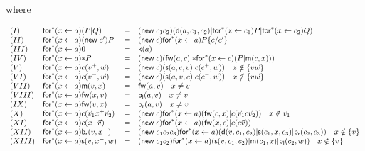 \documentclass[submission,copyright,creativecommons]{eptcs}
\newcommand{\ldb}{[\![}
\newcommand{\rdb}{]\!]}
\newcommand{\pzero}{\mathbin{0}}
\newcommand{\substn}[2]{\{ #1 / #2 \}}
\newcommand{\meaningof}[1]{\ldb #1 \rdb}
\theoremstyle{definition}
\theoremstyle{remark}
\theoremstyle{remark}
\begin{document}

where

\[\begin{array}{llrl}
(I)&\mathsf{for}^*(x \leftarrow a)(P|Q) &=& (\mathsf{new}\; c_1c_2)(\mathsf{d}(a,c_1,c_2) | \mathsf{for}^*(x \leftarrow c_1)P | \mathsf{for}^*(x \leftarrow c_2)Q)\\
(II)&\mathsf{for}^*(x \leftarrow a)(\mathsf{new}\; c')P &=& (\mathsf{new}\; c)\mathsf{for}^*(x \leftarrow a)P\substn{c}{c'} \\
(III)& \mathsf{for}^*(x \leftarrow a)\pzero &=& \mathsf{k}(a) \\
(IV)&\mathsf{for}^*(x \leftarrow a)\mathsf{*}P &=& (\mathsf{new}\;c)(\mathsf{fw}(a,c) | \mathsf{*}\mathsf{for}^*(x \leftarrow c)(P | \mathsf{m}(c,x)))\\
(V)&\mathsf{for}^*(x \leftarrow a)c(v^+,\vec{w}) &=& (\mathsf{new}\;c)(\mathsf{s}(a,c,v) | c(c^+,\vec{w})) \mbox{\quad $x \notin \{v\vec{w}\}$}\\
(VI)&\mathsf{for}^*(x \leftarrow a)c(v^-,\vec{w})&=& (\mathsf{new}\;c)(\mathsf{s}(a,v,c) | c(c^-,\vec{w})) \mbox{\quad $x \notin \{v\vec{w}\}$}\\
(VII)&\mathsf{for}^*(x \leftarrow a)\mathsf{m}(v,x)&=& \mathsf{fw}(a,v) \mbox{\quad $x \neq v$}\\
(VIII)&\mathsf{for}^*(x \leftarrow a)\mathsf{fw}(x,v)&=& \mathsf{b}_{\mathsf{l}}(a,v) \mbox{\quad $x \neq v$}\\
(IX)&\mathsf{for}^*(x \leftarrow a)\mathsf{fw}(v,x)&=& \mathsf{b}_{\mathsf{r}}(a,v) \mbox{\quad $x \neq v$}\\
(X)&\mathsf{for}^*(x \leftarrow a)c(\vec{v}_1x^+\vec{v}_2)&=&(\mathsf{new}\; c)\mathsf{for}^*(x \leftarrow a)(\mathsf{fw}(c,x) | c(\vec{v}_1c\vec{v}_2)) \mbox{\quad $x \notin \vec{v}_1$}\\
(XI)&\mathsf{for}^*(x \leftarrow a)c(x^-\vec{v})&=& (\mathsf{new}\; c)\mathsf{for}^*(x \leftarrow a)(\mathsf{fw}(x,c) | c(c\vec{v}))\\
(XII)&\mathsf{for}^*(x \leftarrow a)\mathsf{b}_{\mathsf{r}}(v,x^-)&=& (\mathsf{new}\; c_1c_2c_3)\mathsf{for}^*(x \leftarrow a)(\mathsf{d}(v,c_1,c_2)|\mathsf{s}(c_1,x,c_3)|\mathsf{b}_{\mathsf{r}}(c_2,c_3)) \mbox{\quad $x \notin \{v \}$}\\
(XIII)&\mathsf{for}^*(x \leftarrow a)\mathsf{s}(v,x^-,w) &=& (\mathsf{new}\; c_1c_2)\mathsf{for}^*(x \leftarrow a)(\mathsf{s}(v,c_1,c_2) | \mathsf{m}(c_1,x) | \mathsf{b}_{\mathsf{l}}(c_2,w)) \mbox{\quad $x \notin \{v \}$}
\end{array}\]
\end{document}
